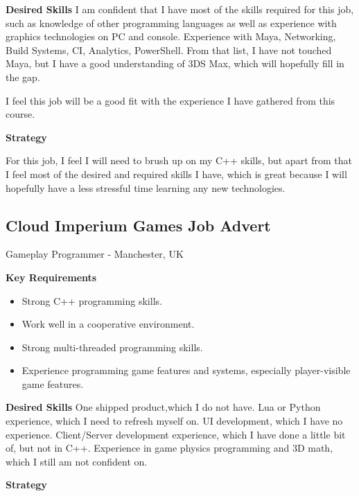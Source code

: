 \documentclass{scrartcl}
\begin{document}
\textbf{Desired Skills}
I am confident that I have most of the skills required for this job, such as knowledge of other programming languages as well as experience with graphics technologies on PC and console.
Experience with Maya, Networking, Build Systems, CI, Analytics, PowerShell. From that list, I have not touched Maya, but I have a good understanding of 3DS Max, which will hopefully fill in the gap.

 I feel this job will be a good fit with the experience I have gathered from this course.

\textbf{Strategy}

 For this job, I feel I will need to brush up on my C++ skills, but apart from that I feel most of the desired and required skills I have, which is great because I will hopefully have a less stressful time learning any new technologies.









\subsection{Cloud Imperium Games Job Advert}
Gameplay Programmer -   Manchester, UK \cite{JobThree}

\textbf{Key Requirements}
\begin{itemize}
	\item Strong C++ programming skills.
	\item Work well in a cooperative environment.
	\item Strong multi-threaded programming skills.
	\item Experience programming game features and systems, especially player-visible game features.
\end{itemize}


\textbf{Desired Skills}
One shipped product,which I do not have.
 Lua or Python experience, which I need to refresh myself on.
 UI development, which I have no experience.
 Client/Server development experience, which I have done a little bit of, but not in C++.
 Experience in game physics programming and 3D math, which I still am not confident on.


\textbf{Strategy}
\end{document}
